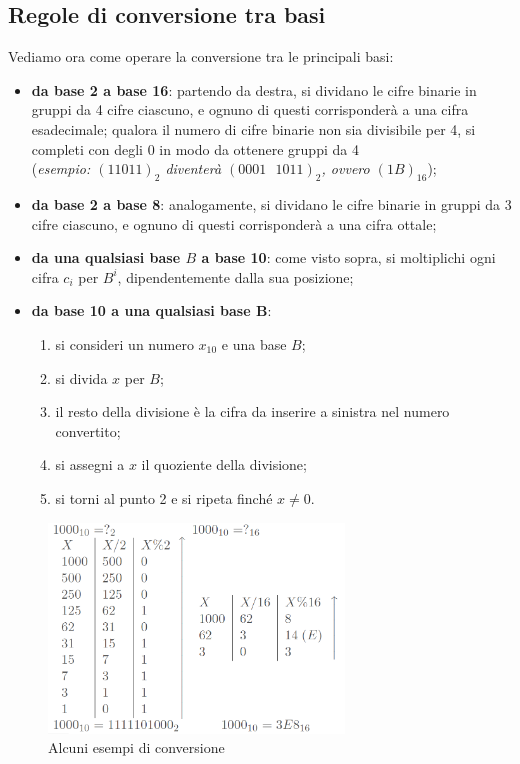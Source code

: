 \documentclass[class=book, crop=false]{standalone}
\begin{document}
\subsection{Regole di conversione tra basi}
Vediamo ora come operare la conversione tra le principali basi:
\begin{itemize}[noitemsep,nolistsep]
	\item \textbf{da base 2 a base 16}: partendo da destra, si dividano le cifre binarie in gruppi da 4 cifre ciascuno, e ognuno di questi corrisponderà a una cifra esadecimale; qualora il numero di cifre binarie non sia divisibile per 4, si completi con degli 0 in modo da ottenere gruppi da 4\\ (\emph{esempio: $(11011)_{2}$ diventerà $(0001\text{ }1011)_{2}$, ovvero $(1B)_{16}$});
	\item \textbf{da base 2 a base 8}: analogamente, si dividano le cifre binarie in gruppi da 3 cifre ciascuno, e ognuno di questi corrisponderà a una cifra ottale;
	\item \textbf{da una qualsiasi base $B$ a base 10}: come visto sopra, si moltiplichi ogni cifra $c_{i}$ per $B^{i}$, dipendentemente dalla sua posizione;
	\item \textbf{da base 10 a una qualsiasi base B}:
	\begin{enumerate}
		\item si consideri un numero $x_{10}$ e una base $B$;
		\item si divida $x$ per $B$;
		\item il resto della divisione è la cifra da inserire a sinistra nel numero convertito;
		\item si assegni a $x$ il quoziente della divisione;
		\item si torni al punto 2 e si ripeta finché $x\neq0$.
	\end{enumerate}
\end{itemize}
\begin{figure}[H]
	\centering
	\includegraphics[width=0.7\textwidth,keepaspectratio]{esempi_conversioni.png}
	\caption{Alcuni esempi di conversione}
\end{figure}
\end{document}
